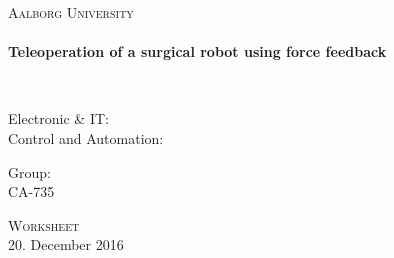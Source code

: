 %


\begin{center}

\vspace*{\fill}

\textsc{\LARGE Aalborg University}\\[1.0cm]

\HRule \\[0.4cm]
{ \HUGE \bfseries  Teleoperation of a surgical robot using force feedback \\[0.5cm] }

\HRule \\[1.5cm]%


\begin{minipage}{0.4\textwidth}
\begin{flushleft} \large
Electronic \& IT:\\
Control and Automation:\\
\end{flushleft}
\end{minipage}
\begin{minipage}{0.4\textwidth}
\begin{flushright} \large
Group: \\
CA-735
\end{flushright}
\end{minipage}

\vspace*{\fill}

\textsc{\Large Worksheet}\\[1.0cm]

{\large 20. December 2016}

\end{center}
\newpage
